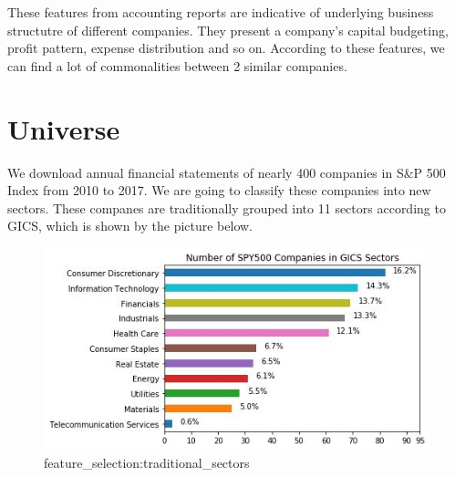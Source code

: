 \documentclass[../main.tex]{subfiles}
\begin{document}
These features from accounting reports are indicative of underlying business structutre of different companies. They present a company's capital budgeting, profit pattern, expense distribution and so on. According to these features, we can find a lot of commonalities between 2 similar companies.

\section{Universe}

We download annual financial statements of nearly 400 companies in S\&P 500 Index from 2010 to 2017. We are going to classify these companies into new sectors. These companes are traditionally grouped into 11 sectors according to GICS, which is shown by the picture below.

\begin{figure}
    \includegraphics{images/traditional_sectors.jpeg}
    \caption{feature_selection:traditional_sectors}
    \label{fig:feature_selection:traditional_sectors}
\end{figure}
\end{document}
